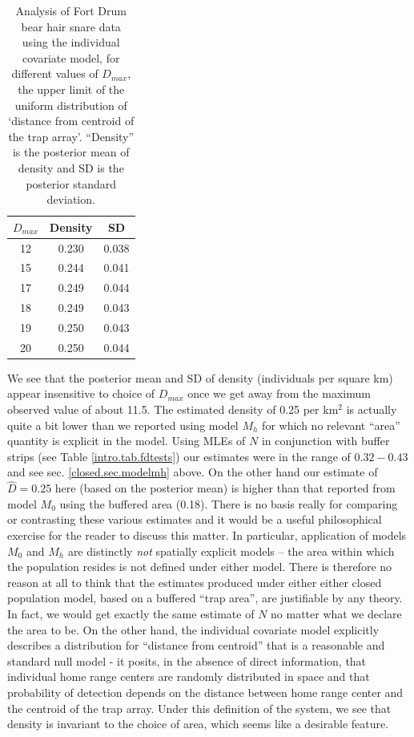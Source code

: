 \begin{table}[htp]
\centering
\caption{Analysis of Fort Drum bear hair snare data using the
  individual covariate model, for different values of $D_{max}$, the upper
  limit of the uniform distribution of `distance from centroid of the
  trap array'. ``Density'' is the posterior mean of density and SD is
  the posterior standard deviation.}
\begin{tabular}{ccc}
\hline \hline
 $D_{max}$ & Density & SD \\ \hline
  12& 0.230 & 0.038 \\
  15& 0.244 &0.041 \\
  17& 0.249 &0.044 \\
  18& 0.249 &0.043\\
  19& 0.250 &0.043\\
  20& 0.250 &0.044
\end{tabular}
\label{closed.tab.Dmax}
\end{table}


We see that the posterior mean and SD of density (individuals per
square km) appear insensitive to choice of $D_{max}$ once we get away from the maximum observed value of about 11.5. The estimated
density of 0.25 per km$^2$ is actually quite a bit lower than we
reported using model $M_h$ for which no relevant ``area'' quantity is
explicit in the model.  Using MLEs of $N$ in conjunction with buffer
strips (see Table \ref{intro.tab.fdtests}) our estimates were in the
range of $0.32-0.43$ and see sec.  \ref{closed.sec.modelmh} above.  On
the other hand our estimate of $\hat{D} = 0.25$ here (based on the
posterior mean) is higher than that reported from model $M_0$ using
the buffered area (0.18). There is no basis really for comparing or
contrasting these various estimates and it would be a useful
philosophical exercise for the reader to discuss this matter. In
particular, application of models $M_0$ and $M_h$ are distinctly {\it
  not} spatially explicit models -- the area within which the
population resides is not defined under either model. There is
therefore no reason at all to think that the estimates produced under
either either closed population model, based on a buffered ``trap
area'', are justifiable by any theory. In fact, we would get exactly
the same estimate of $N$ no matter what we declare the area to be. On
the other hand, the individual covariate model explicitly describes a
distribution for ``distance from centroid'' that is a reasonable and
standard null model - it posits, in the absence of direct information,
that individual home range centers are randomly distributed in space
and that probability of detection depends on the distance between home
range center and the centroid of the trap array. Under this definition
of the system, we see that density is invariant to the choice of area, 
which seems like a desirable feature.


